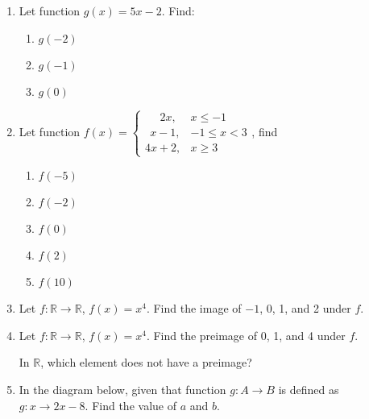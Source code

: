 \documentclass[12pt]{report}
\begin{document}
\begin{enumerate}
  \item Let function $g(x) = 5x-2$. Find:
        \begin{enumerate}
          \item $g(-2)$
          \item $g(-1)$
          \item $g(0)$
        \end{enumerate}

  \item Let function $f(x) = \left\{\begin{array}{ll}
            \ \ \ \ \ \ 2x, & x \leq -1     \\
            \ \ x-1,        & -1 \leq x < 3 \\
            4x + 2,         & x \geq 3
          \end{array}\right.$, find

        \begin{enumerate}
          \item $f(-5)$
          \item $f(-2)$
          \item $f(0)$
          \item $f(2)$
          \item $f(10)$
        \end{enumerate}

  \item Let $f: \mathbb{R} \to \mathbb{R}$, $f(x) = x^4$. Find the image of $-1$, 0, 1,
        and 2 under $f$.

  \item Let $f: \mathbb{R} \to \mathbb{R}$, $f(x) = x^4$. Find the preimage of 0, 1,
        and 4 under $f$.

        In $\mathbb{R}$, which element does not have a preimage?

  \item In the diagram below, given that function $g: A \to B$ is defined as $g: x \to
          2x - 8$. Find the value of $a$ and $b$.
        \begin{center}
        \end{center}


\end{enumerate}
\end{document}
